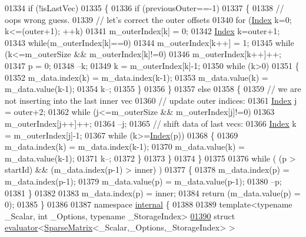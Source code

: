 \begin{DoxyCode}
01334   \textcolor{keywordflow}{if} (!isLastVec)
01335   \{
01336     \textcolor{keywordflow}{if} (previousOuter==-1)
01337     \{
01338       \textcolor{comment}{// oops wrong guess.}
01339       \textcolor{comment}{// let's correct the outer offsets}
01340       \textcolor{keywordflow}{for} (\hyperlink{group___core___module_a554f30542cc2316add4b1ea0a492ff02}{Index} k=0; k<=(outer+1); ++k)
01341         m\_outerIndex[k] = 0;
01342       \hyperlink{group___core___module_a554f30542cc2316add4b1ea0a492ff02}{Index} k=outer+1;
01343       \textcolor{keywordflow}{while}(m\_outerIndex[k]==0)
01344         m\_outerIndex[k++] = 1;
01345       \textcolor{keywordflow}{while} (k<=m\_outerSize && m\_outerIndex[k]!=0)
01346         m\_outerIndex[k++]++;
01347       p = 0;
01348       --k;
01349       k = m\_outerIndex[k]-1;
01350       \textcolor{keywordflow}{while} (k>0)
01351       \{
01352         m\_data.index(k) = m\_data.index(k-1);
01353         m\_data.value(k) = m\_data.value(k-1);
01354         k--;
01355       \}
01356     \}
01357     \textcolor{keywordflow}{else}
01358     \{
01359       \textcolor{comment}{// we are not inserting into the last inner vec}
01360       \textcolor{comment}{// update outer indices:}
01361       \hyperlink{group___core___module_a554f30542cc2316add4b1ea0a492ff02}{Index} j = outer+2;
01362       \textcolor{keywordflow}{while} (j<=m\_outerSize && m\_outerIndex[j]!=0)
01363         m\_outerIndex[j++]++;
01364       --j;
01365       \textcolor{comment}{// shift data of last vecs:}
01366       \hyperlink{group___core___module_a554f30542cc2316add4b1ea0a492ff02}{Index} k = m\_outerIndex[j]-1;
01367       \textcolor{keywordflow}{while} (k>=\hyperlink{namespace_eigen_a62e77e0933482dafde8fe197d9a2cfde}{Index}(p))
01368       \{
01369         m\_data.index(k) = m\_data.index(k-1);
01370         m\_data.value(k) = m\_data.value(k-1);
01371         k--;
01372       \}
01373     \}
01374   \}
01375 
01376   \textcolor{keywordflow}{while} ( (p > startId) && (m\_data.index(p-1) > inner) )
01377   \{
01378     m\_data.index(p) = m\_data.index(p-1);
01379     m\_data.value(p) = m\_data.value(p-1);
01380     --p;
01381   \}
01382 
01383   m\_data.index(p) = inner;
01384   \textcolor{keywordflow}{return} (m\_data.value(p) = 0);
01385 \}
01386 
01387 \textcolor{keyword}{namespace }\hyperlink{namespaceinternal}{internal} \{
01388 
01389 \textcolor{keyword}{template}<\textcolor{keyword}{typename} \_Scalar, \textcolor{keywordtype}{int} \_Options, \textcolor{keyword}{typename} \_StorageIndex>
\hyperlink{struct_eigen_1_1internal_1_1evaluator_3_01_sparse_matrix_3_01___scalar_00_01___options_00_01___storage_index_01_4_01_4}{01390} \textcolor{keyword}{struct }\hyperlink{struct_eigen_1_1internal_1_1evaluator}{evaluator}<\hyperlink{group___sparse_core___module_class_eigen_1_1_sparse_matrix}{SparseMatrix}<\_Scalar,\_Options,\_StorageIndex> >

\end{DoxyCode}

